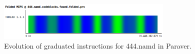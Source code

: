 \begin{figure}
  \centering
  \includegraphics[width=0.75\textwidth]{figures/user-guide/444_namd_tot_ins_paraver.pdf}
  \caption{Evolution of graduated instructions for 444.namd in Paraver.}
  \label{fig:444_namd_instructions_paraver}
\end{figure}

